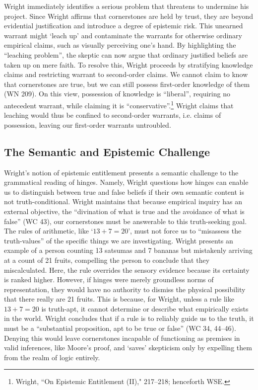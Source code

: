 Wright immediately identifies a serious problem that threatens to
undermine his project. Since Wright affirms that cornerstones are held
by trust, they are beyond evidential justification and introduce a
degree of epistemic risk. This unearned warrant might `leach up' and
contaminate the warrants for otherwise ordinary empirical claims, such
as visually perceiving one's hand. By highlighting the ``leaching
problem'', the skeptic can now argue that ordinary justified beliefs are
taken up on mere faith. To resolve this, Wright proceeds by stratifying
knowledge claims and restricting warrant to second-order claims. We
cannot claim to know that cornerstones are true, but we can still
possess first-order knowledge of them (WN 209). On this view, possession
of knowledge is ``liberal'', requiring no antecedent warrant, while
claiming it is ``conservative''.\footnote{Wright, ``On Epistemic
  Entitlement (II)," 217--218; henceforth WSE.} Wright claims that
leaching would thus be confined to second-order warrants, i.e. claims of
possession, leaving our first-order warrants untroubled.

\subsection{The Semantic and Epistemic Challenge}

Wright's notion of epistemic entitlement presents a semantic challenge
to the grammatical reading of hinges. Namely, Wright questions how
hinges can enable us to distinguish between true and false beliefs if
their own semantic content is not truth-conditional. Wright maintains
that because empirical inquiry has an external objective, the
``divination of what is true and the avoidance of what is false'' (WC
43), our cornerstones must be answerable to this truth-seeking goal. The
rules of arithmetic, like `$13+7=20$', must not force us to ``misassess
the truth-values'' of the specific things we are investigating. Wright
presents an example of a person counting 13 satsumas and 7 bananas but
mistakenly arriving at a count of 21 fruits, compelling the person to
conclude that they miscalculated. Here, the rule overrides the sensory
evidence because its certainty is ranked higher. However, if hinges were
merely groundless norms of representation, they would have no authority
to dismiss the physical possibility that there really are 21 fruits.
This is because, for Wright, unless a rule like $13+7=20$ is truth-apt, it
cannot determine or describe what empirically exists in the world.
Wright concludes that if a rule is to reliably guide us to the truth, it
must be a ``substantial proposition, apt to be true or false'' (WC 34,
44--46). Denying this would leave cornerstones incapable of functioning
as premises in valid inferences, like Moore's proof, and `saves'
skepticism only by expelling them from the realm of logic entirely.

